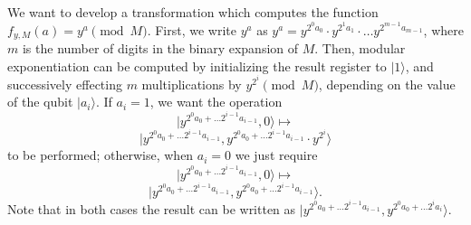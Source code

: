 \documentclass{article}
\def\pagedone{\newpage}
\def\ket#1{|{#1}\rangle}
\begin{document}
\begin{itemize}
We want to develop a transformation which computes the function $f_{y,M}(a)=y^a \pmod M$.  First,
we write $y^a$ as $y^a=y^{2^0a_0}\cdot y^{2^1 a_1} \cdot
\ldots y^{2^{m-1} a_{m-1}}$, where $m$ is the number of digits in the binary expansion of $M$.  Then, modular exponentiation can be
computed by initializing the result register to $\ket 1$, and
successively effecting $m$ multiplications by $y^{2^i}\pmod M$,
depending on the value of the qubit $\ket{a_i}$.
\pagedone
If $a_i=1$, we want
the operation
$$\ket{y^{2^0a_0+\ldots 2^{i-1}a_{i-1}},0} \mapsto $$
$$\ket{y^{2^0a_0+\ldots 2^{i-1}a_{i-1}},y^{2^0a_0+\ldots
    2^{i-1}a_{i-1}}\cdot y^{2^i}}$$
to be performed; otherwise, when
$a_i=0$ we just require 
$$\ket{y^{2^0a_0+\ldots 2^{i-1}a_{i-1}},0} \mapsto $$
$$\ket{y^{2^0a_0+\ldots 2^{i-1}a_{i-1}},y^{2^0a_0+\ldots
    2^{i-1}a_{i-1}}}.$$
Note that in both cases the result can be written as
$\ket{y^{2^0a_0+\ldots 2^{i-1}a_{i-1}},y^{2^0a_0+\ldots 2^ia_i}}$.

\pagedone


\end{itemize}
\end{document}

